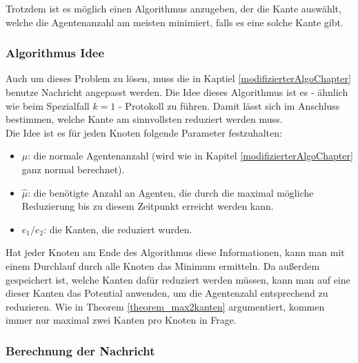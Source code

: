 Trotzdem ist es möglich einen Algorithmus anzugeben, der die Kante auswählt, welche die Agentenanzahl am meisten minimiert, falls es eine solche Kante gibt.


\subsubsection{Algorithmus Idee}

	Auch um dieses Problem zu lösen, muss die in Kaptiel \ref{modifizierterAlgoChapter} benutze Nachricht angepasst werden. Die Idee dieses Algorithmus ist es - ähnlich wie beim Spezialfall $k = 1$ -  Protokoll zu führen. Damit lässt sich im Anschluss bestimmen, welche Kante am sinnvollsten reduziert werden muss.\\
	Die Idee ist es für jeden Knoten folgende Parameter festzuhalten: 
	\begin{itemize}
		\item $\mu$: die normale Agentenanzahl (wird wie in Kapitel \ref{modifizierterAlgoChapter} ganz normal berechnet).
		\item $\hat{\mu}$: die benötigte Anzahl an  Agenten, die durch die maximal mögliche Reduzierung bis zu diesem Zeitpunkt erreicht werden kann.
		\item $e_{1} / e_{2}$: die Kanten, die reduziert wurden.
	\end{itemize}
	Hat jeder Knoten am Ende des Algorithmus diese Informationen, kann man mit einem Durchlauf durch alle Knoten das Minimum ermitteln. Da außerdem gespeichert ist, welche Kanten dafür reduziert werden müssen, kann man auf eine dieser Kanten das Potential anwenden, um die Agentenzahl entsprechend zu reduzieren. Wie in Theorem \ref{theorem_max2kanten} argumentiert, kommen immer nur maximal zwei Kanten pro Knoten in Frage.
	
	\subsubsection{Berechnung der Nachricht}
	
